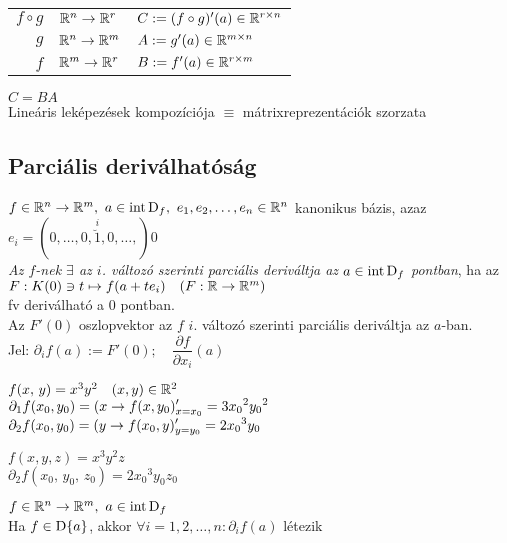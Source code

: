 \begin{megj}\ \\
  \begin{tabular}{r@{$\,\in\,$}l@{$\ \nn\ $}l}
    $f\circ g$ & $\mathbb{R}^n\to\mathbb{R}^r$ &  $C:=(f\circ g)'(a)\in\mathbb{R}^{r\times n}$\\
    $g$ & $\mathbb{R}^n\to\mathbb{R}^m$ &  $A:=g'(a)\in\mathbb{R}^{m\times n}$\\
    $f$ & $\mathbb{R}^m\to\mathbb{R}^r$ &  $B:=f'(a)\in\mathbb{R}^{r\times m}$\\
  \end{tabular}$ C = BA$\\
Lineáris leképezések kompozíciója $\equiv$ mátrixreprezentációk szorzata
\end{megj}


\subsection{Parciális deriválhatóság}

\begin{de}
  $f\in\RnRm,\ a\in\intD_f,\ e_1,e_2,\dotsc,e_n\in\R^n$ kanonikus bázis, azaz $e_i = (0,\dotsc,0,
  \overset{i}{\breve{1}}, 0,\dotsc,)0 $\\
  \emph{Az $f$-nek $\exists$ az $i$. változó szerinti parciális deriváltja az $a\in\operatorname{int\,D}_f$ pontban}, ha az\\
  $F: K(0)\owns t \mapsto f(a+t e_i)\quad (F: \mathbb{R}\to\mathbb{R}^m)$\\
  fv deriválható a $0$ pontban.\\
  Az $F'(0)$ oszlopvektor az $f$ $i$. változó szerinti parciális deriváltja az $a$-ban.\\
  Jel: $\partial_i f(a) := F'(0);\quad \dfrac {\partial f}{\partial {x_i}}(a)$ 
\end{de}

\begin{Pl}
  \item $f(x,\,y) = x^3 y^2\quad (x,y)\in\mathbb{R}^2$\\
    $\displaystyle\partial_1 f(x_0,y_0) = (x\to f(x,y_0)'_{x=x_0} = 3{x_0}^2{y_0}^2$\\
    $\displaystyle\partial_2 f(x_0,y_0) = (y\to f(x_0,y)'_{y=y_0} = 2{x_0}^3y_0$
  \item $f(x,y,z) = x^3 y^2 z$\\
    $\partial_2 f(x_0,\,y_0,\,z_0)= 2{x_0}^3y_0z_0$
\end{Pl}


\begin{te}
  $f\in\mathbb{R}^n\to\mathbb{R}^m,\ a\in\operatorname{int\,D}_f$\\
  Ha $f\in\operatorname{D}\{a\}$, akkor $\forall i=1,2,\dotsc,n\colon  \partial_if(a)$ létezik
\end{te}

